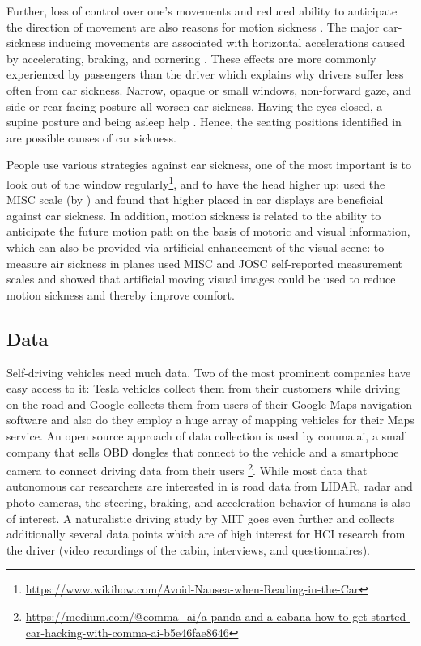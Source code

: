 Further, loss of control over one’s movements and reduced ability to anticipate the direction of movement are also reasons for motion sickness \citep{Sivak2015}. The major car-sickness inducing movements are associated with horizontal accelerations caused by accelerating, braking, and cornering \citep{Diels2016}. These effects are more commonly experienced by passengers than the driver which explains why drivers suffer less often from car sickness. Narrow, opaque or small windows, non-forward gaze, and side or rear facing posture all worsen car sickness. Having the eyes closed, a supine posture and being asleep help \citep{Sivak2015}. Hence, the seating positions identified in \emph{} are possible causes of car sickness. 

People use various strategies against car sickness, one of the most important is to look out of the window regularly\footnote{\url{https://www.wikihow.com/Avoid-Nausea-when-Reading-in-the-Car}}, and to have the head higher up: \citet{Kuiper2018LookingCarsickness} used the MISC scale (by \citet{Bos2005MotionView}) and found that higher placed in car displays are beneficial against car sickness. In addition, motion sickness is related to the ability to anticipate the future motion path on the basis of motoric and visual information, which can also be provided via artificial enhancement of the visual scene: to measure air sickness in planes \cite{Feenstra2011AAirsickness} used MISC and JOSC self-reported measurement scales and showed that artificial moving visual images could be used to reduce motion sickness and thereby improve comfort.

\subsection{Data}
\label{sec:Data}
Self-driving vehicles need much data. Two of the most prominent companies have easy access to it: Tesla vehicles collect them from their customers while driving on the road and Google collects them from users of their Google Maps navigation software and also do they employ a huge array of mapping vehicles for their Maps service. An open source approach of data collection is used by comma.ai, a small company that sells OBD dongles that connect to the vehicle and a smartphone camera to connect driving data from their users \footnote{\url{https://medium.com/@comma_ai/a-panda-and-a-cabana-how-to-get-started-car-hacking-with-comma-ai-b5e46fae8646}}. While most data that autonomous car researchers are interested in is road data from LIDAR, radar and photo cameras, the steering, braking, and acceleration behavior of humans is also of interest. A naturalistic driving study by MIT goes even further \cite{Fridman2017MITAutomation} and collects additionally several data points which are of high interest for HCI research from the driver (video recordings of the cabin, interviews, and questionnaires). 


